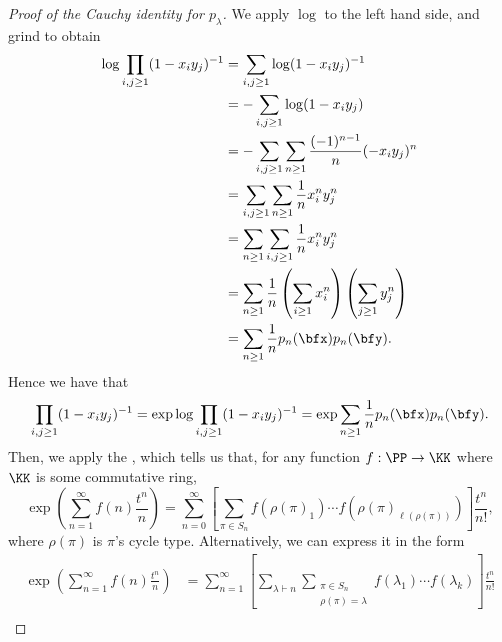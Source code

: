 \documentclass{article}
\begin{document}
\begin{proof}
    [Proof of the Cauchy identity for $p_\lambda$]
    We apply $\log$ to the left hand side, and grind to obtain
    \begin{align*}
        \log \prod_{i,j \geq 1}
        (1-x_iy_j)^{-1}
        &=
        \sum_{i,j\geq1}
        \log(1-x_iy_j)^{-1} \\
        &=
        -\sum_{i,j \geq 1}
        \log(1-x_iy_j) \\
        &=
        -\sum_{i,j \geq 1}
        \sum_{n\geq 1}
        \frac{(-1)^{n-1}}{n}(-x_iy_j)^n \\
        &=
        \sum_{i,j \geq 1}
        \sum_{n\geq 1}
        \frac{1}{n} x_i^ny_j^n \\
        &=
        \sum_{n \geq 1}
        \sum_{i,j\geq 1}
        \frac{1}{n} x_i^ny_j^n \\
        &=
        \sum_{n \geq 1}
        \frac{1}{n}
        \left(\sum_{i\geq1}x_i^n\right)
        \left(\sum_{j\geq1}y_j^n\right) \\
        &=
        \sum_{n \geq 1}
        \frac{1}{n} p_n(\bfx) p_n(\bfy).
    \end{align*}
    Hence we have that
    \[
        \prod_{i,j\geq1}(1-x_iy_j)^{-1} 
        = 
        \exp \log \prod_{i,j\geq1}(1-x_iy_j)^{-1} 
        = 
        \exp \sum_{n \geq 1} 
        \frac{1}{n} p_n(\bfx) p_n(\bfy).
    \]
    Then, we apply the , which tells us that, for any function $f: \PP \to \KK$ where $\KK$ is some commutative ring,
    \[
        \exp
        \left(
            \sum_{n=1}^\infty
            f(n)
            \frac{t^n}{n}
        \right)
        =
        \sum_{n=0}^\infty
        \left[
            \sum_{
                \pi \in S_n
            }
            f(\rho(\pi)_1) \cdots f(\rho(\pi)_{\ell(\rho(\pi))})
        \right]
        \frac{t^n}{n!},
    \]
    where $\rho(\pi)$ is $\pi$'s cycle type.
    Alternatively, we can express it in the form
    \begin{align*}
        \exp
        \left(
            \sum_{n=1}^\infty
            f(n)
            \frac{t^n}{n}
        \right)
        &=
        \sum_{n=1}^\infty
        \left[
            \sum_{\lambda \vdash n}
            \sum_{
                \substack{
                \pi \in S_n \\
                \rho(\pi) = \lambda
                }
            }
            f(\lambda_1) \cdots f(\lambda_k)
        \right]
        \frac{t^n}{n!} \\

\end{align*}
\end{proof}
\end{document}
